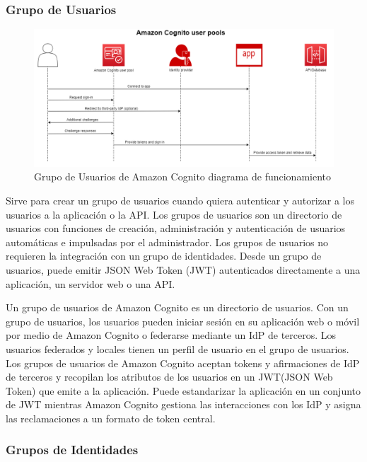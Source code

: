 \subsubsection{Grupo de Usuarios}

\begin{figure}[hbtp]
\centering
\includegraphics[width=.75\textwidth]{imagenes/ac_user_pool.png}
\caption{Grupo de Usuarios de Amazon Cognito diagrama de funcionamiento}
\end{figure}

\noindent Sirve para crear un grupo de usuarios cuando quiera autenticar y autorizar a los usuarios a la aplicación o la API. Los grupos de usuarios son un directorio de usuarios con funciones de creación, administración y autenticación de usuarios automáticas e impulsadas por el administrador. 
Los grupos de usuarios no requieren la integración con un grupo de identidades. Desde un grupo de usuarios, puede emitir JSON Web Token (JWT) autenticados directamente a una aplicación, un servidor web o una API.


\noindent Un grupo de usuarios de Amazon Cognito es un directorio de usuarios. Con un grupo de usuarios, los usuarios pueden iniciar sesión en su aplicación web o móvil por medio de Amazon Cognito o federarse mediante un IdP de terceros. Los usuarios federados y locales tienen un perfil de usuario en el grupo de usuarios.
Los grupos de usuarios de Amazon Cognito aceptan tokens y afirmaciones de IdP de terceros y recopilan los atributos de los usuarios en un JWT(JSON Web Token) que emite a la aplicación. Puede estandarizar la aplicación en un conjunto de JWT mientras Amazon Cognito gestiona las interacciones con los IdP y asigna las reclamaciones a un formato de token central. 

\subsubsection{Grupos de Identidades}


